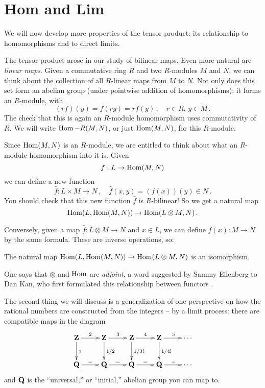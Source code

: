 \section{Hom and Lim}\label{limits}

We will now develop more properties of the tensor product: its relationship to
homomorphisms and to direct limits. 

The tensor product arose in our study of bilinear maps. Even more natural are
{\em linear maps}. Given a commutative ring $R$ and two $R$-modules $M$ and 
$N$, we can think about the collection of all $R$-linear maps from $M$ to $N$.
Not only does this set form an abelian group (under pointwise addition of 
homomorphisms); it forms an $R$-module, with
\[
(rf)(y)=f(ry)=rf(y)\,,\quad r\in R,\, y\in M\,.
\]
The check that this is again an $R$-module homomorphism uses commutativity of
$R$. We will write $\operatorname{Hom}-R(M,N)$, or just $\operatorname{Hom}(M,N)$, for this $R$-module. 

Since $\operatorname{Hom}(M,N)$ is an $R$-module, we are entitled to think about what 
an $R$-module homomorphism into it is. Given 
\[
f:L\to\operatorname{Hom}(M,N)
\]
we can define a new function 
\[
\hat f:L\times M\to N\,,\quad \hat f(x,y)=(f(x))(y)\in N\,.
\]
You should check that this new function $\hat f$ is $R$-bilinear! So we get 
a natural map
\[
\operatorname{Hom}(L,\operatorname{Hom}(M,N))\to\operatorname{Hom}(L\otimes M,N)\,.
\]

Conversely, given a map $\hat f:L\otimes M\to N$ and $x\in L$, we can define
$f(x):M\to N$ by the same formula. These are inverse operations, so:
\begin{lemma}
The natural map $\operatorname{Hom}(L,\operatorname{Hom}(M,N))\to\operatorname{Hom}(L\otimes M,N)$ is an isomorphism.
\end{lemma}

One says that $\otimes$ and $\operatorname{Hom}$ are {\em adjoint}, a word suggested by 
Sammy Eilenberg to Dan Kan, who first formulated this relationship between
functors \cite{kan}. 


The second thing we will discuss is a generalization of one perspective on
how the rational numbers are constructed from the integers -- by a limit 
process: there are compatible maps in the diagram 
\[
\xymatrix{
\Z \ar[r]^2 \ar[d]^1 & \Z \ar[r]^3 \ar[d]^{1/2} & \Z \ar[r]^4 \ar[d]^{1/3!}
& \Z \ar[r]^5 \ar[d]^{1/4!} & \cdots \\
\QQ \ar[r]^= & \QQ \ar[r]^= & \QQ \ar[r]^= & \QQ \ar[r]^= & \cdots
}\]
and $\mathbf Q$ is the ``universal,'' or ``initial,'' abelian group you can map to.


